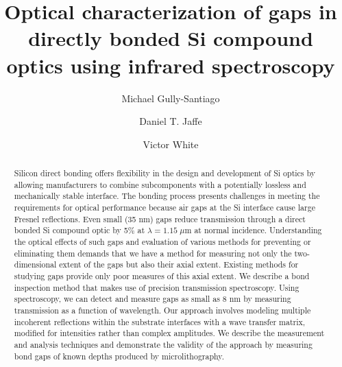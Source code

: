 \documentclass[osajnl,preprint,showpacs,superscriptaddress,12pt]{revtex4-1} %
\begin{document}
\title{Optical characterization of gaps in directly bonded Si compound optics using infrared spectroscopy}

\author{Michael Gully-Santiago}
\author{Daniel T. Jaffe}

\author{Victor White}


\begin{abstract}
Silicon direct bonding offers flexibility in the design and development of Si optics by allowing manufacturers to combine subcomponents with a potentially lossless and mechanically stable interface. The bonding process presents challenges in meeting the requirements for optical performance because air gaps at the Si interface cause large Fresnel reflections. Even small (35 nm) gaps reduce transmission through a direct bonded Si compound optic by 5\% at $\lambda = 1.15 \; \mu$m at normal incidence. Understanding the optical effects of such gaps and evaluation of various methods for preventing or eliminating them demands that we have a method for measuring not only the two-dimensional extent of the gaps but also their axial extent.  Existing methods for studying gaps provide only poor measures of this axial extent.  We describe a bond inspection method that makes use of precision transmission spectroscopy.  Using spectroscopy, we can detect and measure gaps as small as 8 nm by measuring transmission as a function of wavelength. Our approach involves modeling multiple incoherent reflections within the substrate interfaces with a wave transfer matrix, modified for intensities rather than complex amplitudes. We describe the measurement and analysis techniques and demonstrate the validity of the approach by measuring bond gaps of known depths produced by microlithography.
\end{abstract}


\maketitle %
\end{document}

